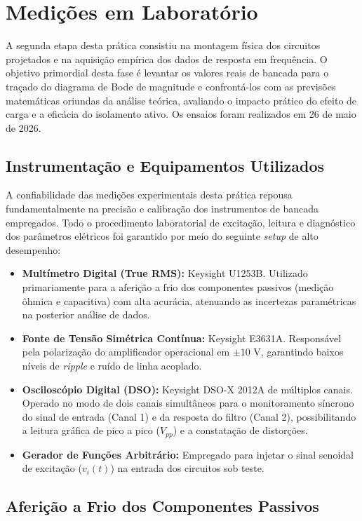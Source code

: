 \chapter{Medições em Laboratório}

A segunda etapa desta prática consistiu na montagem física dos circuitos projetados e na aquisição empírica dos dados de resposta em frequência. O objetivo primordial desta fase é levantar os valores reais de bancada para o traçado do diagrama de Bode de magnitude e confrontá-los com as previsões matemáticas oriundas da análise teórica, avaliando o impacto prático do efeito de carga e a eficácia do isolamento ativo. Os ensaios foram realizados em 26 de maio de 2026.

\section{Instrumentação e Equipamentos Utilizados}

A confiabilidade das medições experimentais desta prática repousa fundamentalmente na precisão e calibração dos instrumentos de bancada empregados. Todo o procedimento laboratorial de excitação, leitura e diagnóstico dos parâmetros elétricos foi garantido por meio do seguinte \textit{setup} de alto desempenho:

\begin{itemize}
	\item \textbf{Multímetro Digital (True RMS):} Keysight U1253B. Utilizado primariamente para a aferição a frio dos componentes passivos (medição ôhmica e capacitiva) com alta acurácia, atenuando as incertezas paramétricas na posterior análise de dados.
	\item \textbf{Fonte de Tensão Simétrica Contínua:} Keysight E3631A. Responsável pela polarização do amplificador operacional em $\pm 10\text{ V}$, garantindo baixos níveis de \textit{ripple} e ruído de linha acoplado.
	\item \textbf{Osciloscópio Digital (DSO):} Keysight DSO-X 2012A de múltiplos canais. Operado no modo de dois canais simultâneos para o monitoramento síncrono do sinal de entrada (Canal 1) e da resposta do filtro (Canal 2), possibilitando a leitura gráfica de pico a pico ($V_{pp}$) e a constatação de distorções.
	\item \textbf{Gerador de Funções Arbitrário:} Empregado para injetar o sinal senoidal de excitação ($v_i(t)$) na entrada dos circuitos sob teste.
\end{itemize}

\section{Aferição a Frio dos Componentes Passivos}

